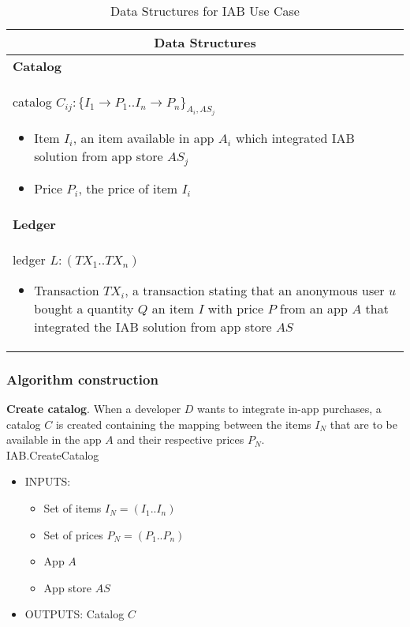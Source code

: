 \begin{table}[H]
\footnotesize
\centering
\begin{tabular}{|p{}|}
\hline
\multicolumn{1}{|c|}{Data Structures} \\
\hline \vspace{0.05cm}
\textbf{Catalog} \\
catalog $C_{ij} : \{I_1 \to P_1..I_n \to P_n\}_{A_i, AS_j}$
\begin{itemize}
	\item Item $I_i$, an item available in app $A_i$ which integrated IAB solution from app store $AS_j$
	\item Price $P_i$, the price of item $I_i$
\end{itemize} \\
\textbf{Ledger} \\
ledger $L : (TX_1..TX_n)$
\begin{itemize}
	\item Transaction $TX_i$, a transaction stating that an anonymous user $u$ bought a quantity $Q$ an item $I$ with price $P$ from an app $A$ that integrated the IAB solution from app store $AS$
\end{itemize} \\
\hline
\end{tabular}
\caption{Data Structures for IAB Use Case}
\label{table: data_structures_iab}
\end{table}

\subsubsection{Algorithm construction}

\noindent \textbf{Create catalog}. When a developer $D$ wants to integrate in-app purchases, a catalog $C$ is created containing the mapping between the items $I_N$ that are to be available in the app $A$ and their respective prices $P_N$. \\

\textsf{IAB.CreateCatalog}
\begin{itemize}
	\item INPUTS:
	\begin{itemize}
		\item Set of items $I_N = (I_1..I_n)$
		\item Set of prices $P_N = (P_1..P_n)$
		\item App $A$
		\item App store $AS$
	\end{itemize}
	\item OUTPUTS: Catalog $C$
\end{itemize}


